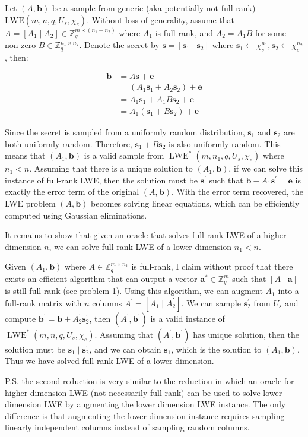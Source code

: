 \documentclass{article}
\begin{document}
Let $(A, \mathbf{b})$ be a sample from generic (aka potentially not full-rank) $\text{LWE}(m, n, q, U_s, \chi_e)$. Without loss of generality, assume that $A = [A_1 \mid A_2] \in \mathbb{Z}_q^{m \times (n_1 + n_2)}$ where $A_1$ is full-rank, and $A_2 = A_1B$ for some non-zero $B \in \mathbb{Z}_q^{n_1 \times n_2}$. Denote the secret by $\mathbf{s} = [\mathbf{s}_1 \mid \mathbf{s}_2]$ where $\mathbf{s}_1 \leftarrow \chi_s^{n_1}, \mathbf{s}_2 \leftarrow \chi_s^{n_2}$, then:

$$
\begin{aligned}
\mathbf{b} &= A\mathbf{s} + \mathbf{e} \\
&= (A_1\mathbf{s}_1 + A_2\mathbf{s}_2) + \mathbf{e} \\
&= A_1\mathbf{s}_1 + A_1B\mathbf{s}_2 + \mathbf{e} \\
&= A_1(\mathbf{s}_1 + B\mathbf{s}_2) + \mathbf{e}
\end{aligned}
$$

Since the secret is sampled from a uniformly random distribution, $\mathbf{s}_1$ and $\mathbf{s}_2$ are both uniformly random. Therefore, $\mathbf{s}_1 + B\mathbf{s}_2$ is also uniformly random. This means that $(A_1, \mathbf{b})$ is a valid sample from $\operatorname{LWE}^\ast(m, n_1, q, U_s, \chi_e)$ where $n_1 < n$. Assuming that there is a unique solution to $(A_1, \mathbf{b})$, if we can solve this instance of full-rank LWE, then the solution must be $\mathbf{s}^\prime$ such that $\mathbf{b} - A_1\mathbf{s}^\prime = \mathbf{e}$ is exactly the error term of the original $(A, \mathbf{b})$. With the error term recovered, the LWE problem $(A, \mathbf{b})$ becomes solving linear equations, which can be efficiently computed using Gaussian eliminations.

It remains to show that given an oracle that solves full-rank LWE of a higher dimension $n$, we can solve full-rank LWE of a lower dimension $n_1 < n$.

Given $(A_1, \mathbf{b})$ where $A \in \mathbb{Z}_q^{m \times n_1}$ is full-rank, I claim without proof that there exists an efficient algorithm that can output a vector $\mathbf{a}^\ast \in \mathbb{Z}_q^m$ such that $[A \;\vert\; \mathbf{a}]$ is still full-rank (see problem 1). Using this algorithm, we can augment $A_1$ into a full-rank matrix with $n$ columns $A^\prime = [ A_1 \;\vert\; A_2^\prime ]$. We can sample $\mathbf{s}_2^\prime$ from $U_s$ and compute $\mathbf{b}^\prime = \mathbf{b} + A_2^\prime\mathbf{s}_2^\prime$, then $(A^\prime, \mathbf{b}^\prime)$ is a valid instance of $\operatorname{LWE}^\ast(m, n, q, U_s, \chi_e)$. Assuming that $(A^\prime, \mathbf{b}^\prime)$ has unique solution, then the solution must be $\mathbf{s}_1 \;\vert\; \mathbf{s}_2^\prime$, and we can obtain $\mathbf{s}_1$, which is the solution to $(A_1, \mathbf{b})$. Thus we have solved full-rank LWE of a lower dimension.

P.S. the second reduction is very similar to the reduction in which an oracle for higher dimension LWE (not necessarily full-rank) can be used to solve lower dimension LWE by augmenting the lower dimension LWE instance. The only difference is that augmenting the lower dimension instance requires sampling linearly independent columns instead of sampling random columns.
\end{document}
